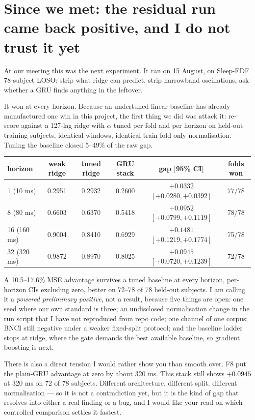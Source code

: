 \documentclass[11pt]{article}
\begin{document}
\section{Since we met: the residual run came back positive, and I do not trust it yet}

At our meeting this was the next experiment. It ran on 15 August, on Sleep-EDF
78-subject LOSO: strip what ridge can predict, strip narrowband oscillations,
ask whether a GRU finds anything in the leftover.

It won at every horizon. Because an undertuned linear baseline has already
manufactured one win in this project, the first thing we did was attack it:
re-score against a 127-lag ridge with $\alpha$ tuned per fold and per horizon
on held-out training subjects, identical windows, identical train-fold-only
normalisation. Tuning the baseline closed 5--49\% of the raw gap.

\begin{center}
\begin{tabular}{lccccc}
\toprule
horizon & weak ridge & tuned ridge & GRU stack & gap [95\% CI] & folds won \\
\midrule
1 (10 ms)   & 0.2951 & 0.2932 & 0.2600 & $+0.0332$ $[+0.0280, +0.0392]$ & 77/78 \\
8 (80 ms)   & 0.6603 & 0.6370 & 0.5418 & $+0.0952$ $[+0.0799, +0.1119]$ & 78/78 \\
16 (160 ms) & 0.9004 & 0.8410 & 0.6929 & $+0.1481$ $[+0.1219, +0.1774]$ & 75/78 \\
32 (320 ms) & 0.9872 & 0.8970 & 0.8025 & $+0.0945$ $[+0.0720, +0.1239]$ & 72/78 \\
\bottomrule
\end{tabular}
\end{center}

A 10.5--17.6\% MSE advantage survives a tuned baseline at every horizon,
per-horizon CIs excluding zero, better on 72--78 of 78 held-out subjects. I am calling it a
\emph{powered preliminary positive}, not a result, because five things are open:
one seed where our own standard is three; an undisclosed normalisation change in
the run script that I have not reproduced from repo code; one channel of one
corpus; BNCI still negative under a weaker fixed-split protocol; and the
baseline ladder stops at ridge, where the gate demands the best available
baseline, so gradient boosting is next.

There is also a direct tension I would rather show you than smooth over. F8 put
the plain-GRU advantage at zero by about 320 ms. This stack still shows
$+0.0945$ at 320 ms on 72 of 78 subjects. Different architecture, different
split, different normalisation --- so it is not a contradiction yet, but it is
the kind of gap that resolves into either a real finding or a bug, and I would
like your read on which controlled comparison settles it fastest.
\end{document}

